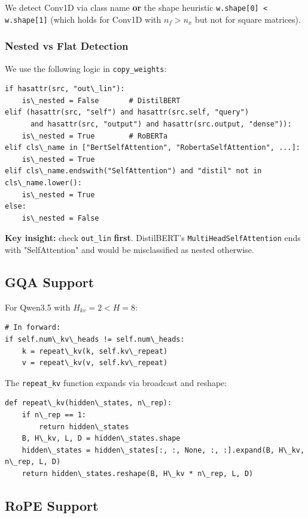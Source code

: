 We detect Conv1D via class name \textbf{or} the shape heuristic 
\texttt{w.shape[0] \textless{} w.shape[1]} (which holds for Conv1D with $n_f > n_x$ but 
not for square matrices).

\subsubsection{Nested vs Flat Detection}

We use the following logic in \texttt{copy\_weights}:

\begin{lstlisting}
if hasattr(src, "out\_lin"):
    is\_nested = False       # DistilBERT
elif (hasattr(src, "self") and hasattr(src.self, "query")
      and hasattr(src, "output") and hasattr(src.output, "dense")):
    is\_nested = True        # RoBERTa
elif cls\_name in ["BertSelfAttention", "RobertaSelfAttention", ...]:
    is\_nested = True
elif cls\_name.endswith("SelfAttention") and "distil" not in cls\_name.lower():
    is\_nested = True
else:
    is\_nested = False
\end{lstlisting}

\textbf{Key insight:} check \texttt{out\_lin} \textbf{first}. DistilBERT's 
\texttt{MultiHeadSelfAttention} ends with "SelfAttention" and would be misclassified 
as nested otherwise.

\subsection{GQA Support}

For Qwen3.5 with $H_{kv} = 2 < H = 8$:

\begin{lstlisting}
# In forward:
if self.num\_kv\_heads != self.num\_heads:
    k = repeat\_kv(k, self.kv\_repeat)
    v = repeat\_kv(v, self.kv\_repeat)
\end{lstlisting}

The \texttt{repeat\_kv} function expands via broadcast and reshape:

\begin{lstlisting}
def repeat\_kv(hidden\_states, n\_rep):
    if n\_rep == 1:
        return hidden\_states
    B, H\_kv, L, D = hidden\_states.shape
    hidden\_states = hidden\_states[:, :, None, :, :].expand(B, H\_kv, n\_rep, L, D)
    return hidden\_states.reshape(B, H\_kv * n\_rep, L, D)
\end{lstlisting}

\subsection{RoPE Support}

